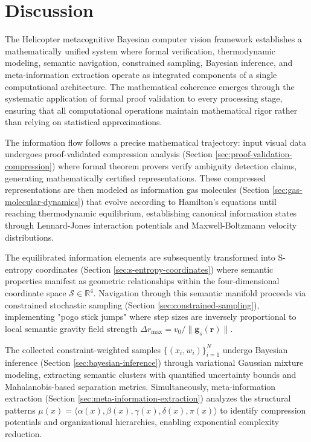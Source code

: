 \section{Discussion}
\label{sec:discussion}

The Helicopter metacognitive Bayesian computer vision framework establishes a mathematically unified system where formal verification, thermodynamic modeling, semantic navigation, constrained sampling, Bayesian inference, and meta-information extraction operate as integrated components of a single computational architecture. The mathematical coherence emerges through the systematic application of formal proof validation to every processing stage, ensuring that all computational operations maintain mathematical rigor rather than relying on statistical approximations.

The information flow follows a precise mathematical trajectory: input visual data undergoes proof-validated compression analysis (Section \ref{sec:proof-validation-compression}) where formal theorem provers verify ambiguity detection claims, generating mathematically certified representations. These compressed representations are then modeled as information gas molecules (Section \ref{sec:gas-molecular-dynamics}) that evolve according to Hamilton's equations until reaching thermodynamic equilibrium, establishing canonical information states through Lennard-Jones interaction potentials and Maxwell-Boltzmann velocity distributions.

The equilibrated information elements are subsequently transformed into S-entropy coordinates (Section \ref{sec:s-entropy-coordinates}) where semantic properties manifest as geometric relationships within the four-dimensional coordinate space $\mathcal{S} \in \mathbb{R}^4$. Navigation through this semantic manifold proceeds via constrained stochastic sampling (Section \ref{sec:constrained-sampling}), implementing "pogo stick jumps" where step sizes are inversely proportional to local semantic gravity field strength $\Delta r_{\max} = v_0/\|\mathbf{g}_s(\mathbf{r})\|$.

The collected constraint-weighted samples $\{(x_i, w_i)\}_{i=1}^N$ undergo Bayesian inference (Section \ref{sec:bayesian-inference}) through variational Gaussian mixture modeling, extracting semantic clusters with quantified uncertainty bounds and Mahalanobis-based separation metrics. Simultaneously, meta-information extraction (Section \ref{sec:meta-information-extraction}) analyzes the structural patterns $\mu(x) = \langle \alpha(x), \beta(x), \gamma(x), \delta(x), \pi(x) \rangle$ to identify compression potentials and organizational hierarchies, enabling exponential complexity reduction.

